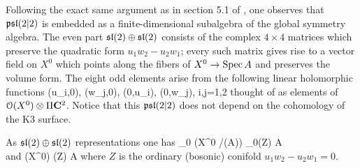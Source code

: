 \documentclass[../main.tex]{subfiles}
\begin{document}
Following the exact same argument as in section 5.1 of \cite{CP}, one observes that $\mathfrak{psl}(2|2)$ is embedded as a finite-dimensional subalgebra of the global symmetry algebra.
The even part $\mathfrak{sl}(2) \oplus \mathfrak{sl}(2)$ consists of the complex $4 \times 4$ matrices which preserve the quadratic form $u_1 w_2 - u_2 w_1$; every such matrix gives rise to a vector field on $X^0$ which points along the fibers of $X^0 \to \operatorname{Spec} A$ and preserves the volume form.
The eight odd elements arise from the following linear holomorphic functions 
\beqn
(u_i,0), (w_j,0), (0,u_i), (0,w_j), \quad i,j=1,2
\eeqn
thought of as elements of $\mathcal O(X^0) \otimes \Pi \mathbf{C}^2$.
Notice that this $\mathfrak{psl}(2|2)$ does not depend on the cohomology of the K3 surface.

As $\mathfrak{sl}(2) \oplus \mathfrak{sl}(2)$ representations one has
\beqn
{}_0 \left(X^0 \slash \Spec(A)\right) \cong {}_0(Z) \otimes A \\
\eeqn
and
\beqn
\cO(X^0) \cong \cO(Z) \otimes A
\eeqn
where $Z$ is the ordinary (bosonic) conifold $u_1 w_2 - u_2 w_1 = 0$.
\end{document}
